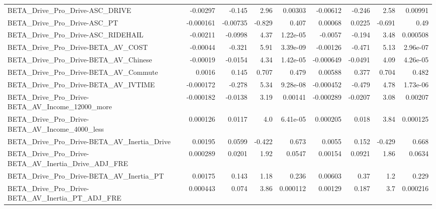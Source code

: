 \begin{tabular}{lrrrrrrrr}
BETA\_Drive\_Pro\_Drive-ASC\_DRIVE                     &    -0.00297 &       -0.145 &     2.96 &  0.00303 &   -0.00612 &      -0.246 &         2.58 &       0.00991 \\
BETA\_Drive\_Pro\_Drive-ASC\_PT                        &   -0.000161 &     -0.00735 &   -0.829 &    0.407 &    0.00068 &      0.0225 &       -0.691 &          0.49 \\
BETA\_Drive\_Pro\_Drive-ASC\_RIDEHAIL                  &    -0.00211 &      -0.0998 &     4.37 & 1.22e-05 &    -0.0057 &      -0.194 &         3.48 &      0.000508 \\
BETA\_Drive\_Pro\_Drive-BETA\_AV\_COST                  &    -0.00044 &       -0.321 &     5.91 & 3.39e-09 &   -0.00126 &      -0.471 &         5.13 &      2.96e-07 \\
BETA\_Drive\_Pro\_Drive-BETA\_AV\_Chinese               &    -0.00019 &      -0.0154 &     4.34 & 1.42e-05 &  -0.000649 &     -0.0491 &         4.09 &      4.26e-05 \\
BETA\_Drive\_Pro\_Drive-BETA\_AV\_Commute               &      0.0016 &        0.145 &    0.707 &    0.479 &    0.00588 &       0.377 &        0.704 &         0.482 \\
BETA\_Drive\_Pro\_Drive-BETA\_AV\_IVTIME                &   -0.000172 &       -0.278 &     5.34 & 9.28e-08 &  -0.000452 &      -0.479 &         4.78 &      1.73e-06 \\
BETA\_Drive\_Pro\_Drive-BETA\_AV\_Income\_12000\_more     &   -0.000182 &      -0.0138 &     3.19 &  0.00141 &  -0.000289 &     -0.0207 &         3.08 &       0.00207 \\
BETA\_Drive\_Pro\_Drive-BETA\_AV\_Income\_4000\_less      &    0.000126 &       0.0117 &      4.0 & 6.41e-05 &   0.000205 &       0.018 &         3.84 &      0.000125 \\
BETA\_Drive\_Pro\_Drive-BETA\_AV\_Inertia\_Drive         &     0.00195 &       0.0599 &   -0.422 &    0.673 &     0.0055 &       0.152 &       -0.429 &         0.668 \\
BETA\_Drive\_Pro\_Drive-BETA\_AV\_Inertia\_Drive\_ADJ\_FRE &    0.000289 &       0.0201 &     1.92 &   0.0547 &    0.00154 &      0.0921 &         1.86 &        0.0634 \\
BETA\_Drive\_Pro\_Drive-BETA\_AV\_Inertia\_PT            &     0.00175 &        0.143 &     1.18 &    0.236 &    0.00603 &        0.37 &          1.2 &         0.229 \\
BETA\_Drive\_Pro\_Drive-BETA\_AV\_Inertia\_PT\_ADJ\_FRE    &    0.000443 &        0.074 &     3.86 & 0.000112 &    0.00129 &       0.187 &          3.7 &      0.000216 \\

\end{tabular}
